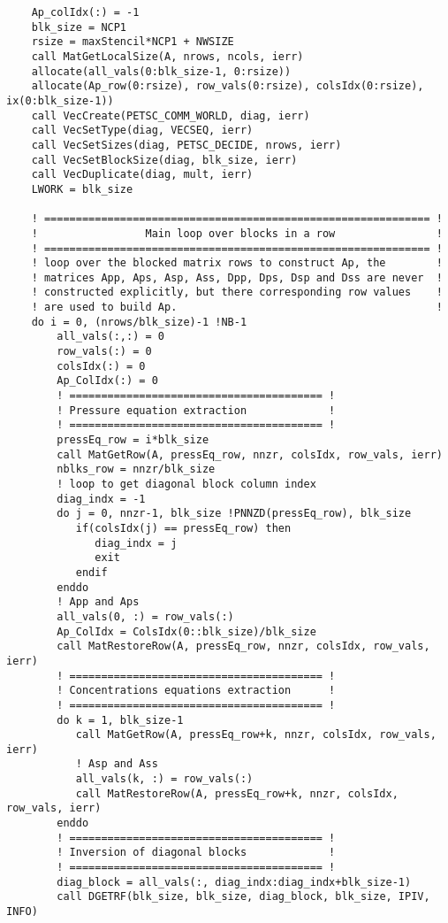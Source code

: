 \begin{lstlisting}
    Ap_colIdx(:) = -1
    blk_size = NCP1
    rsize = maxStencil*NCP1 + NWSIZE
    call MatGetLocalSize(A, nrows, ncols, ierr)
    allocate(all_vals(0:blk_size-1, 0:rsize))
    allocate(Ap_row(0:rsize), row_vals(0:rsize), colsIdx(0:rsize), ix(0:blk_size-1))
    call VecCreate(PETSC_COMM_WORLD, diag, ierr)
    call VecSetType(diag, VECSEQ, ierr)
    call VecSetSizes(diag, PETSC_DECIDE, nrows, ierr)
    call VecSetBlockSize(diag, blk_size, ierr)
    call VecDuplicate(diag, mult, ierr)
    LWORK = blk_size

    ! ============================================================= !
    !                 Main loop over blocks in a row                !
    ! ============================================================= !
    ! loop over the blocked matrix rows to construct Ap, the        !
    ! matrices App, Aps, Asp, Ass, Dpp, Dps, Dsp and Dss are never  !
    ! constructed explicitly, but there corresponding row values    !
    ! are used to build Ap.                                         !
    do i = 0, (nrows/blk_size)-1 !NB-1
        all_vals(:,:) = 0
        row_vals(:) = 0
        colsIdx(:) = 0
        Ap_ColIdx(:) = 0
        ! ======================================== !
        ! Pressure equation extraction             !
        ! ======================================== !
        pressEq_row = i*blk_size
        call MatGetRow(A, pressEq_row, nnzr, colsIdx, row_vals, ierr)
        nblks_row = nnzr/blk_size
        ! loop to get diagonal block column index 
        diag_indx = -1 
        do j = 0, nnzr-1, blk_size !PNNZD(pressEq_row), blk_size
           if(colsIdx(j) == pressEq_row) then
              diag_indx = j
              exit
           endif
        enddo
        ! App and Aps
        all_vals(0, :) = row_vals(:)
        Ap_ColIdx = ColsIdx(0::blk_size)/blk_size
        call MatRestoreRow(A, pressEq_row, nnzr, colsIdx, row_vals, ierr)
        ! ======================================== !
        ! Concentrations equations extraction      !
        ! ======================================== !
        do k = 1, blk_size-1 
           call MatGetRow(A, pressEq_row+k, nnzr, colsIdx, row_vals, ierr)
           ! Asp and Ass
           all_vals(k, :) = row_vals(:)
           call MatRestoreRow(A, pressEq_row+k, nnzr, colsIdx, row_vals, ierr)
        enddo
        ! ======================================== !
        ! Inversion of diagonal blocks             !
        ! ======================================== !
        diag_block = all_vals(:, diag_indx:diag_indx+blk_size-1)
        call DGETRF(blk_size, blk_size, diag_block, blk_size, IPIV, INFO)

\end{lstlisting}
